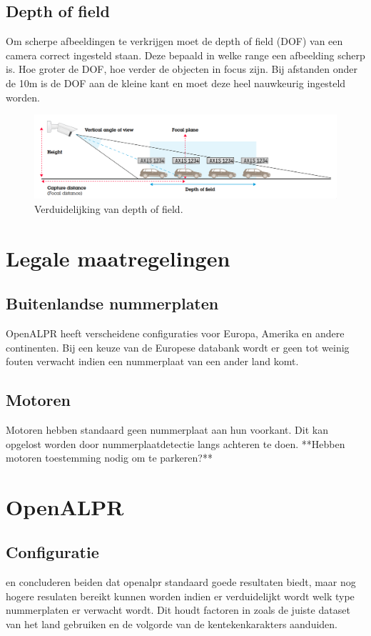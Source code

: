 \subsection{Depth of field}
Om scherpe afbeeldingen te verkrijgen moet de depth of field (DOF) van een camera correct ingesteld staan. Deze bepaald in welke range een afbeelding scherp is. Hoe groter de DOF, hoe verder de objecten in focus zijn. Bij afstanden onder de 10m is de DOF aan de kleine kant en moet deze heel nauwkeurig ingesteld worden. \autocite{axis2019license}

\begin{figure}[h!]
	\centering
	\includegraphics[width=\linewidth]{img/depth-of-field.png}
	\caption{Verduidelijking van depth of field. \autocite{axis2019license}}
\end{figure}


\section{Legale maatregelingen}
\subsection{Buitenlandse nummerplaten}
OpenALPR heeft verscheidene configuraties voor Europa, Amerika en andere continenten. Bij een keuze van de Europese databank wordt er geen tot weinig fouten verwacht indien een nummerplaat van een ander land komt.

\subsection{Motoren}
Motoren hebben standaard geen nummerplaat aan hun voorkant. Dit kan opgelost worden door nummerplaatdetectie langs achteren te doen.
**Hebben motoren toestemming nodig om te parkeren?**

\section{OpenALPR}

\subsection{Configuratie}
\textcite{arrieta2019prototype} en \textcite{buhus2016automatic} concluderen beiden dat openalpr standaard goede resultaten biedt, maar nog hogere resulaten bereikt kunnen worden indien er verduidelijkt wordt welk type nummerplaten er verwacht wordt. Dit houdt factoren in zoals de juiste dataset van het land gebruiken en de volgorde van de kentekenkarakters aanduiden.

